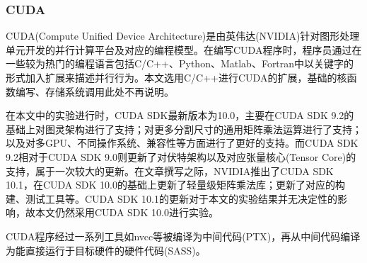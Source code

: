 \subsubsection{CUDA}
\par CUDA(Compute Unified Device Architecture)是由英伟达(NVIDIA)针对图形处理单元开发的并行计算平台及对应的编程模型。在编写CUDA程序时，程序员通过在一些较为热门的编程语言包括C/C++、Python、Matlab、Fortran中以关键字的形式加入扩展来描述并行行为\cite{CUDAZONE}。本文选用C/C++进行CUDA的扩展，基础的核函数编写、存储系统调用\cite{EVENEASIER}此处不再说明。
\par 在本文中的实验进行时，CUDA SDK最新版本为10.0，主要在CUDA SDK 9.2的基础上对图灵架构进行了支持；对更多分割尺寸的通用矩阵乘法运算进行了支持\cite{10.0PATCH}；以及对多GPU、不同操作系统、兼容性等方面进行了更好的支持。而CUDA SDK 9.2相对于CUDA SDK 9.0则更新了对伏特架构以及对应张量核心(Tensor Core)的支持，属于一次较大的更新\cite{9.2PATCH}。在文章撰写之际，NVIDIA推出了CUDA SDK 10.1，在CUDA SDK 10.0的基础上更新了轻量级矩阵乘法库；更新了对应的构建、测试工具等\cite{10.1PATCH}。CUDA SDK 10.1的更新对于本文的实验结果并无决定性的影响，故本文仍然采用CUDA SDK 10.0进行实验。
\par CUDA程序经过一系列工具如nvcc等被编译为中间代码(PTX)，再从中间代码编译为能直接运行于目标硬件的硬件代码(SASS)。
